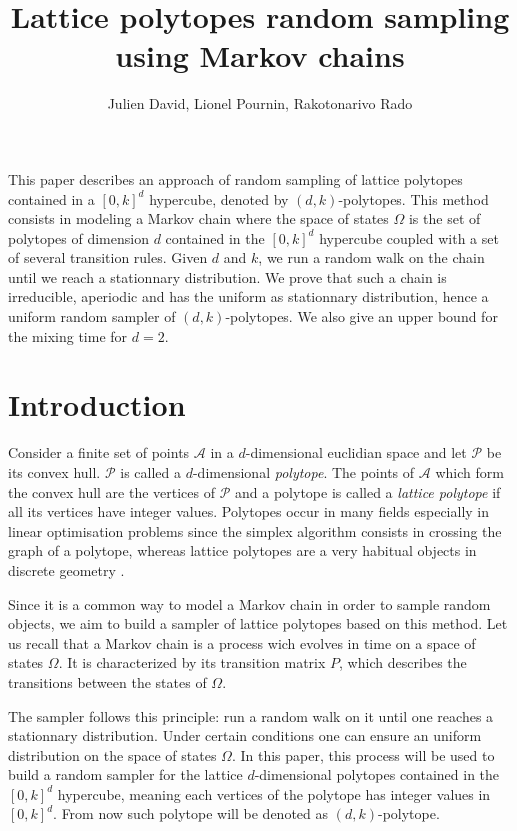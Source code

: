 \documentclass[a4paper]{article}
\newcommand{\A}{\mathcal{A}}
\newcommand{\p}{\mathcal{P}}
\begin{document}
\title{Lattice polytopes random sampling using Markov chains}
\author{Julien David, Lionel Pournin, Rakotonarivo Rado}
\maketitle

 This paper describes an approach of random sampling of lattice polytopes contained in a $[0,k]^d$ hypercube, denoted by $(d,k)$-polytopes. This method consists in modeling a Markov chain where the space of states $\Omega$ is the set of polytopes of dimension $d$ contained in the $[0,k]^d$ hypercube coupled with a set of several transition rules. Given $d$ and $k$, we run a random walk on the chain until we reach a stationnary distribution. We prove that such a chain is irreducible, aperiodic and has the uniform as stationnary distribution, hence a uniform random sampler of $(d,k)$-polytopes. We also give an upper bound for the mixing time for $d = 2$.

\section{Introduction}

Consider a finite set of points $\A$ in a $d$-dimensional euclidian space and let $\p$ be its convex hull. $\p$ is called a $d$-dimensional \textit{polytope}. The points of $\A$ which form the convex hull are the vertices of $\p$ and a polytope is called a \textit{lattice polytope} if all its vertices have integer values. Polytopes occur in many fields especially in linear optimisation problems since the simplex algorithm consists in crossing the graph of a polytope, whereas lattice polytopes are a very habitual objects in discrete geometry \cite{ziegler1995lectures}.

Since it is a common way to model a Markov chain in order to sample random objects, we aim to build a sampler of lattice polytopes based on this method. Let us recall that a Markov chain is a process wich evolves in time on a space of states $\Omega$. It is characterized by its transition matrix $P$, which describes the transitions between the states of $\Omega$.

The sampler follows this principle: run a random walk on it until one reaches a stationnary distribution. Under certain conditions one can ensure an uniform distribution on the space of states $\Omega$. In this paper, this process will be used to build a random sampler for the lattice $d$-dimensional polytopes contained in the $[0,k]^d$ hypercube, meaning each vertices of the polytope has integer values in $[0,k]^d$. From now such polytope will be denoted as $(d,k)$-polytope.
\end{document}
